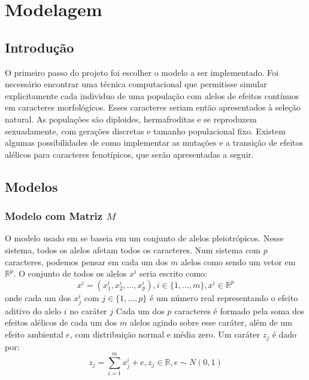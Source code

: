 \pagestyle{empty}
\cleardoublepage
\pagestyle{fancy}
\chapter{Modelagem}\label{cap2}

\section{Introdução}\label{cap2:intro}

O primeiro passo do projeto foi escolher o modelo a ser implementado.
Foi necessário encontrar uma técnica computacional que permitisse
simular explicitamente cada individuo de uma população com alelos de efeitos
contínuos em caracteres morfológicos.
Esses caracteres seriam então apresentados à seleção natural.
As populações são diploides, hermafroditas e se reproduzem sexuadamente,
com gerações discretas e tamanho populacional fixo.
Existem algumas possibilidades de como implementar as mutações e
a transição de efeitos alélicos para caracteres fenotípicos, que serão
apresentadas a seguir.

\section{Modelos}\label{cap2:mem}

\subsection{Modelo com Matriz $M$}\label{cap2:mem:ModelM}

O modelo usado em \cite{Jones2003, Jones2004, Jones2007} se baseia em um
conjunto de alelos pleiotrópicos.
Nesse sistema, todos os alelos afetam todos os caracteres.
Num sistema com $p$ caracteres, podemos pensar em cada um
dos $m$ alelos como sendo um vetor em $\mathbb{R}^p$.
O conjunto de todos os alelos $x^i$ seria escrito como:
\begin{equation}
x^i = ( x^i_1, x^i_2,\ldots, x^i_p), i \in \{1,\ldots, m\}, x^i \in \mathbb{R}^p
\end{equation}
onde cada um dos $x^i_j$ com $j \in \{1,\ldots, p\}$ é um número real
representando o efeito aditivo do alelo $i$ no caráter $j$
Cada um dos
$p$ caracteres é formado pela soma dos efeitos alélicos de cada um dos
$m$ alelos agindo sobre esse caráter, além de um efeito ambiental $e$, com
distribuição normal e média zero.
Um caráter $z_j$ é dado
por:
\begin{equation}
z_j = \sum_{i=1}^m x^i_j + e, z_j \in \mathbb{R}, e \sim N(0, 1)
\end{equation}

